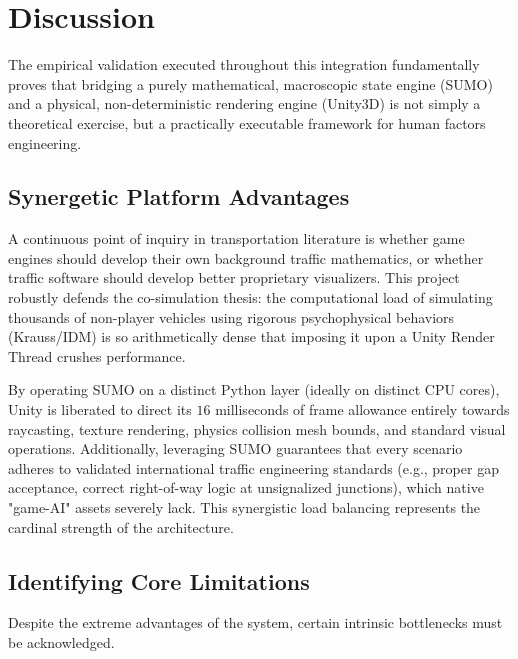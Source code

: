 \chapter{Discussion}

The empirical validation executed throughout this integration fundamentally proves that bridging a purely mathematical, macroscopic state engine (SUMO) and a physical, non-deterministic rendering engine (Unity3D) is not simply a theoretical exercise, but a practically executable framework for human factors engineering.

\section{Synergetic Platform Advantages}

A continuous point of inquiry in transportation literature is whether game engines should develop their own background traffic mathematics, or whether traffic software should develop better proprietary visualizers. This project robustly defends the co-simulation thesis: the computational load of simulating thousands of non-player vehicles using rigorous psychophysical behaviors (Krauss/IDM) is so arithmetically dense that imposing it upon a Unity Render Thread crushes performance. 

By operating SUMO on a distinct Python layer (ideally on distinct CPU cores), Unity is liberated to direct its $16$ milliseconds of frame allowance entirely towards raycasting, texture rendering, physics collision mesh bounds, and standard visual operations. Additionally, leveraging SUMO guarantees that every scenario adheres to validated international traffic engineering standards (e.g., proper gap acceptance, correct right-of-way logic at unsignalized junctions), which native "game-AI" assets severely lack. This synergistic load balancing represents the cardinal strength of the architecture.

\section{Identifying Core Limitations}

Despite the extreme advantages of the system, certain intrinsic bottlenecks must be acknowledged. 


